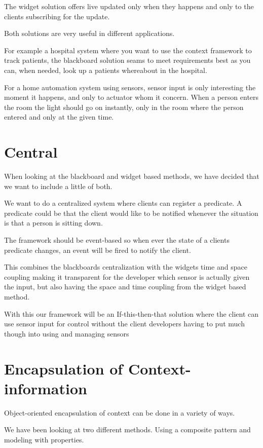 \documentclass[]{report}
\begin{document}
The widget solution offers live updated only when they happens and only to the clients subscribing for the update.

Both solutions are very useful in different applications.

For example a hospital system where you want to use the context framework to track patients, the blackboard solution seams to meet requirements best as you can, when needed, look up a patients whereabout in the hospital.

For a home automation system using sensors, sensor input is only interesting the moment it happens, and only to actuator whom it concern. When a person enters the room the light should go on instantly, only in the room where the person entered and only at the given time.


\section{Central}

When looking at the blackboard and widget based methods, we have decided that we want to include a little of both.

We want to do a centralized system where clients can register a predicate. A predicate could be that the client would like to be notified whenever the situation is that a person is sitting down.

The framework should be event-based so when ever the state of a clients predicate changes, an event will be fired to notify the client.  

This combines the blackboards centralization with the widgets time and space coupling making it transparent for the developer which sensor is actually given the input, but also having the space and time coupling from the widget based method.

With this our framework will be an If-this-then-that solution where the client can use sensor input for control without the  client developers having to put much though into using and managing sensors   


\section{Encapsulation of Context-information}
Object-oriented encapsulation of context can be done in a variety of ways.

We have been looking at two different methods. Using a composite pattern and modeling with properties.
\end{document}
